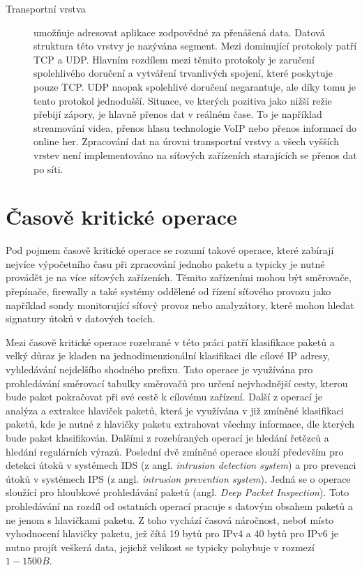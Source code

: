 \begin{description}
\item[Transportní vrstva]\label{layers:transport} %
umožňuje adresovat aplikace zodpovědné za přenášená data. Datová struktura této vrstvy
je nazývána segment. Mezi dominující protokoly patří TCP a UDP. Hlavním rozdílem mezi těmito protokoly
je zaručení spolehlivého doručení a vytváření trvanlivých spojení, které poskytuje pouze TCP.
UDP naopak spolehlivé doručení negarantuje, ale díky tomu je tento protokol jednodušší.
Situace, ve kterých pozitiva jako
nižší režie přebijí zápory, je hlavně přenos dat v reálném čase. To je například streamování videa,
přenos hlasu technologie VoIP nebo přenos informací do online her.
Zpracování dat na úrovni transportní vrstvy a všech vyšších vrstev není implementováno na síťových
zařízeních starajících se přenos dat po síti.

\end{description}

\section{Časově kritické operace} %
Pod pojmem časově kritické operace se rozumí takové operace, které zabírají nejvíce výpočetního
času při zpracování jednoho paketu a typicky je nutné provádět je na více síťových zařízeních.
Těmito zařízeními mohou být směrovače, přepínače, firewally a také systémy
oddělené od řízení síťového provozu jako například sondy monitorující síťový provoz nebo analyzátory,
které mohou hledat signatury útoků v datových tocích.

Mezi časově kritické operace rozebrané v této práci patří klasifikace paketů a velký důraz je kladen na
jednodimenzionální klasifikaci dle cílové IP adresy, vyhledávání nejdelšího shodného prefixu.
Tato operace je využívána pro prohledávání směrovací tabulky směrovačů pro určení nejvhodnější cesty, kterou
bude paket pokračovat při své cestě k cílovému zařízení.
Další z operací je analýza a extrakce hlaviček paketů, která je využívána v již zmíněné klasifikaci paketů,
kde je nutné z hlavičky paketu extrahovat všechny informace, dle kterých bude paket klasifikován.
Dalšími z rozebíraných operací je hledání řetězců a hledání regulárních výrazů.
Poslední dvě zmíněné operace slouží především pro detekci útoků v systémech IDS (z angl. \textit{intrusion detection system})
a pro prevenci útoků v systémech IPS (z angl. \textit{intrusion prevention system}). Jedná se o operace sloužící
pro hloubkové prohledávání paketů (angl. \textit{Deep Packet Inspection}). Toto prohledávání na rozdíl od ostatních operací
pracuje s datovým obsahem paketů a ne jenom s hlavičkami paketu. Z toho vychází časová náročnost,
neboť místo vyhodnocení hlavičky paketu, jež čítá 19 bytů pro IPv4 a 40 bytů pro IPv6 je nutno
projít veškerá data, jejichž velikost se typicky pohybuje v rozmezí $1 - 1500B$.

